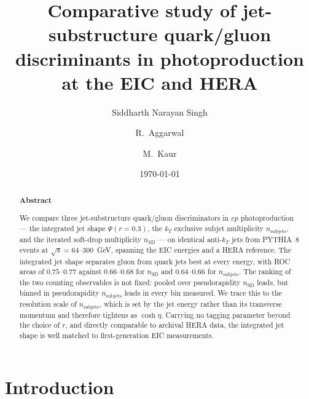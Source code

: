 \documentclass[reprint,amsmath,amssymb,aps,prd,floatfix]{revtex4-2}
\begin{document}

\title{Comparative study of jet-substructure quark/gluon discriminants in photoproduction at the EIC and HERA}

\author{Siddharth Narayan Singh}

\author{R.~Aggarwal}

\author{M.~Kaur}

\date{\today}

\begin{abstract}
\centering \textbf{Abstract}
\begin{justify}
We compare three jet-substructure quark/gluon discriminators in $ep$ photoproduction --- the integrated jet shape $\Psi(r=0.3)$, the $k_T$ exclusive subjet multiplicity $n_{\mathrm{subjets}}$, and the iterated soft-drop multiplicity $n_{\mathrm{SD}}$ --- on identical anti-$k_T$ jets from PYTHIA~8 events at $\sqrt{s} = 64$--$300$~GeV, spanning the EIC energies and a HERA reference. The integrated jet shape separates gluon from quark jets best at every energy, with ROC areas of $0.75$--$0.77$ against $0.66$--$0.68$ for $n_{\mathrm{SD}}$ and $0.64$--$0.66$ for $n_{\mathrm{subjets}}$. The ranking of the two counting observables is not fixed: pooled over pseudorapidity $n_{\mathrm{SD}}$ leads, but binned in pseudorapidity $n_{\mathrm{subjets}}$ leads in every bin measured. We trace this to the resolution scale of $n_{\mathrm{subjets}}$, which is set by the jet energy rather than its transverse momentum and therefore tightens as $\cosh\eta$. Carrying no tagging parameter beyond the choice of $r$, and directly comparable to archival HERA data, the integrated jet shape is well matched to first-generation EIC measurements.
\end{justify}
\end{abstract}

\maketitle


\section{Introduction}\label{sec:intro}
\end{document}
